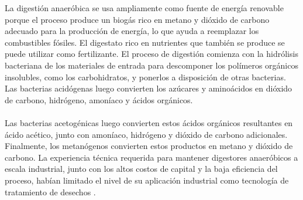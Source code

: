 \documentclass[a4paper,11pt]{article}
\begin{document}
La digestión anaeróbica se usa ampliamente como fuente de energía renovable porque el proceso produce un biogás rico en metano y dióxido de carbono adecuado para la producción de energía, lo que ayuda a reemplazar los combustibles fósiles. El digestato rico en nutrientes que también se produce se puede utilizar como fertilizante. El proceso de digestión comienza con la hidrólisis bacteriana de los materiales de entrada para descomponer los polímeros orgánicos insolubles, como los carbohidratos, y ponerlos a disposición de otras bacterias. Las bacterias acidógenas luego convierten los azúcares y aminoácidos en dióxido de carbono, hidrógeno, amoníaco y ácidos orgánicos. 
\\\\
Las bacterias acetogénicas luego convierten estos ácidos orgánicos resultantes en ácido acético, junto con amoníaco, hidrógeno y dióxido de carbono adicionales. Finalmente, los metanógenos convierten estos productos en metano y dióxido de carbono. La experiencia técnica requerida para mantener digestores anaeróbicos a escala industrial, junto con los altos costos de capital y la baja eficiencia del proceso, habían limitado el nivel de su aplicación industrial como tecnología de tratamiento de desechos \cite{Ionel2010}.
\end{document}
